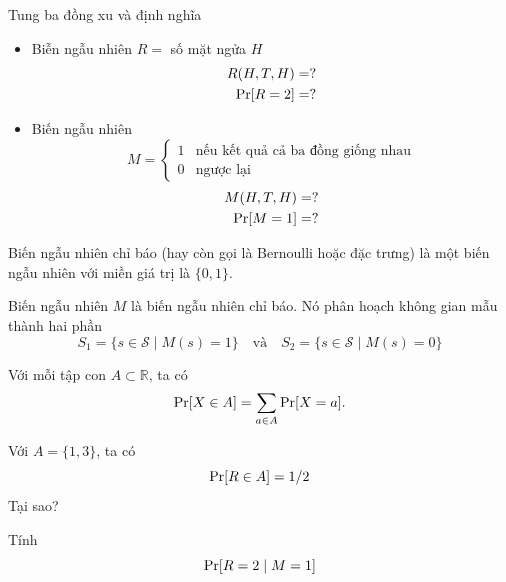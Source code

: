 \begin{frame}
	\begin{xmpl}
		Tung ba đồng xu và định nghĩa 
		\begin{itemize}
			\item Biễn ngẫu nhiên $R = $ số mặt ngửa $H$
			\begin{align*}
				R(H,T,H) &= ? \\
				\mathrm{Pr}[R = 2] & = ?
			\end{align*}
			\item Biến ngẫu nhiên 
			\[
				M = \begin{cases}
				1 & \text{nếu kết quả cả ba đồng giống nhau}\\
				0 &\text{ngược lại }	
				\end{cases}
			\]
			\begin{align*}
				M(H,T,H) = ? \\
				\mathrm{Pr}[M = 1] = ?
			\end{align*}
		\end{itemize}
	\end{xmpl}
	
\end{frame}
\begin{frame}
	\begin{dfntn}
		Biến ngẫu nhiên chỉ báo (hay còn gọi là Bernoulli hoặc đặc trưng) là một biến ngẫu nhiên với miền giá trị là $\{0,1\}$.
	\end{dfntn}
\begin{xmpl}
	Biến ngẫu nhiên $M$ là biến ngẫu nhiên chỉ báo. Nó phân hoạch không gian mẫu thành hai phần 
	\[
		S_1 = \{s\in \mathcal{S} \mid M(s) = 1\}\quad \text{và}\quad  S_2 = \{s\in \mathcal{S} \mid M(s) = 0\}
	\]
\end{xmpl}
\end{frame}

\begin{frame}
	Với mỗi tập con $A \subset \mathbb{R}$, ta có 
	\[
		\mathrm{Pr}[X \in A ] = \sum_{a \in A} \mathrm{Pr}[X = a].
	\] 
\begin{xmpl}
	Với $A = \{1,3\}$, ta có 
	\[
		\mathrm{Pr}[R \in A] = 1/2
	\]
	Tại sao?
\end{xmpl}
\end{frame}

\begin{frame}
	\begin{xrcs}
		Tính 
		\[
			\mathrm{Pr}[R = 2 \mid M = 1]
		\]
	\end{xrcs}
\end{frame}


